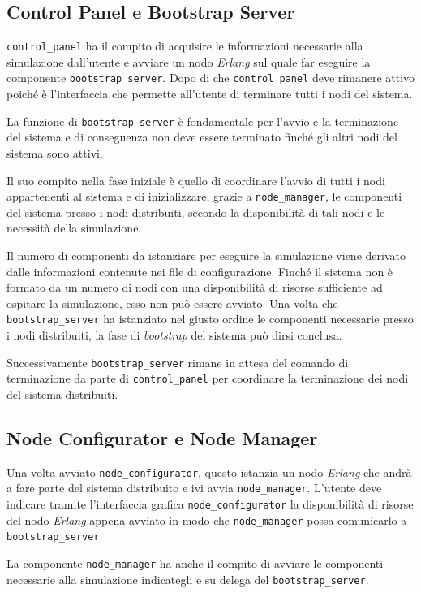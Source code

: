 \documentclass[a4paper]{report}
\newcommand{\Erlang}{\textsl{Erlang}}
\begin{document}
\subsection*{Control Panel e Bootstrap Server}
\texttt{control\_panel} ha il compito di acquisire le informazioni necessarie alla simulazione dall'utente e avviare un nodo \Erlang{} sul quale far eseguire la componente \texttt{bootstrap\_server}.
Dopo di che \texttt{control\_panel} deve rimanere attivo poiché è l'interfaccia che permette all'utente di terminare tutti i nodi del sistema.

La funzione di \texttt{bootstrap\_server} è fondamentale per l'avvio e la terminazione del sistema e di conseguenza non deve essere terminato finché gli altri nodi del sistema sono attivi.

Il suo compito nella fase iniziale è quello di coordinare l'avvio di tutti i nodi appartenenti al sistema e di inizializzare, grazie a \texttt{node\_manager}, le componenti del sistema presso i nodi distribuiti, secondo la disponibilità di tali nodi e le necessità della simulazione.

Il numero di componenti da istanziare per eseguire la simulazione viene derivato dalle informazioni contenute nei file di configurazione. Finché il sistema non è formato da un numero di nodi con una disponibilità di risorse sufficiente ad ospitare la simulazione, esso non può essere avviato.
Una volta che \texttt{bootstrap\_server} ha istanziato nel giusto ordine le componenti necessarie presso i nodi distribuiti, la fase di \textit{bootstrap} del sistema può dirsi conclusa.

Successivamente \texttt{bootstrap\_server} rimane in attesa del comando di terminazione da parte di \texttt{control\_panel} per coordinare la terminazione dei nodi del sistema distribuiti.

\subsection*{Node Configurator e Node Manager}
Una volta avviato \texttt{node\_configurator}, questo istanzia un nodo \Erlang{} che andrà a fare parte del sistema distribuito e ivi avvia \texttt{node\_manager}. L'utente deve indicare tramite l'interfaccia grafica \texttt{node\_configurator} la disponibilità di risorse del nodo \Erlang{} appena avviato in modo che \texttt{node\_manager} possa comunicarlo a \texttt{bootstrap\_server}.

La componente \texttt{node\_manager} ha anche il compito di avviare le componenti necessarie alla simulazione indicategli e su delega del \texttt{bootstrap\_server}.
\end{document}

